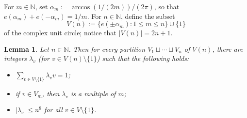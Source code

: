 \documentclass[11pt]{amsart}
\newtheorem{lemma}{Lemma}[section]
\theoremstyle{definition}
\begin{document}
For $m \in \mathbb{N}$, set $\alpha_m:=\arccos(1/(2m))/(2\pi)$, so that
$e(\alpha_m)+e(-\alpha_m)=1/m$.  For $n \in \mathbb{N}$, define the subset
$$V(n):=\{e(\pm \alpha_m): 1\leq m \leq n\} \cup \{1\}$$
of the complex unit circle; notice that $|V(n)|=2n+1$.

\begin{lemma}\label{lem:irrationality-trick}
Let $n \in \mathbb{N}$.  Then for every partition $V_1 \sqcup \cdots \sqcup V_n$ of $V(n)$, there are integers $\lambda_v$ (for $v \in V(n) \setminus \{1\}$) such that the following holds:
\begin{itemize}
    \item $\sum_{v \in V \setminus \{1\}} \lambda_v v=1$;
    \item if $v \in V_m$, then $\lambda_v$ is a multiple of $m$;
    \item $|\lambda_v| \leq n^{8}$ for all $v \in V \setminus \{1\}$.
\end{itemize}
\end{lemma}
\end{document}

